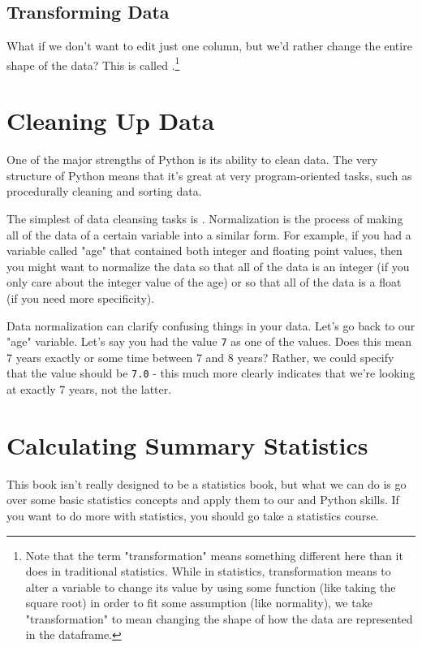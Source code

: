 \subsection{Transforming Data}
What if we don't want to edit just one column, but we'd rather change the entire shape of the data? This is called .\footnote{Note that the term "transformation" means something different here than it does in traditional statistics. While in statistics, transformation means to alter a variable to change its value by using some function (like taking the square root) in order to fit some assumption (like normality), we take "transformation" to mean changing the shape of how the data are represented in the dataframe.}

\section{Cleaning Up Data}
One of the major strengths of Python is its ability to clean data. The very structure of Python means that it's great at very program-oriented tasks, such as procedurally cleaning and sorting data.\par
The simplest of data cleansing tasks is . Normalization is the process of making all of the data of a certain variable into a similar form. For example, if you had a variable called "age" that contained both integer and floating point values, then you might want to normalize the data so that all of the data is an integer (if you only care about the integer value of the age) or so that all of the data is a float (if you need more specificity).\par
Data normalization can clarify confusing things in your data. Let's go back to our "age" variable. Let's say you had the value \verb|7| as one of the values. Does this mean 7 years exactly or some time between 7 and 8 years? Rather, we could specify that the value should be \verb|7.0| - this much more clearly indicates that we're looking at exactly 7 years, not the latter.\par
\section{Calculating Summary Statistics}
This book isn't really designed to be a statistics book, but what we can do is go over some basic statistics concepts and apply them to our  and Python skills. If you want to do more with statistics, you should go take a statistics course.\par
{}
